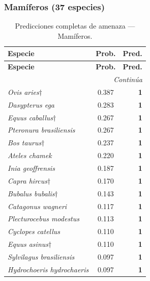 \documentclass[12pt,a4paper]{article}
\begin{document}
\bigskip

\subsubsection*{Mamíferos (37 especies)}

\begin{longtable}{p{6.2cm}cr}
  \caption{Predicciones completas de amenaza --- Mamíferos.} \label{tab:pred_mamiferos} \\
  \toprule
  \textbf{Especie} & \textbf{Prob.} & \textbf{Pred.} \\
  \midrule
  \endfirsthead
  \toprule
  \textbf{Especie} & \textbf{Prob.} & \textbf{Pred.} \\
  \midrule
  \endhead
  \midrule \multicolumn{3}{r}{\textit{Continúa}} \\
  \endfoot
  \bottomrule
  \endlastfoot
  \rowcolor{grisCelda}\textit{Ovis aries}$\dagger$ & 0.387 & \textbf{1} \\
  \rowcolor{grisCelda}\textit{Dasypterus ega} & 0.283 & \textbf{1} \\
  \rowcolor{grisCelda}\textit{Equus caballus}$\dagger$ & 0.267 & \textbf{1} \\
  \rowcolor{grisCelda}\textit{Pteronura brasiliensis} & 0.267 & \textbf{1} \\
  \rowcolor{grisCelda}\textit{Bos taurus}$\dagger$ & 0.237 & \textbf{1} \\
  \rowcolor{grisCelda}\textit{Ateles chamek} & 0.220 & \textbf{1} \\
  \rowcolor{grisCelda}\textit{Inia geoffrensis} & 0.187 & \textbf{1} \\
  \rowcolor{grisCelda}\textit{Capra hircus}$\dagger$ & 0.170 & \textbf{1} \\
  \rowcolor{grisCelda}\textit{Bubalus bubalis}$\dagger$ & 0.143 & \textbf{1} \\
  \rowcolor{grisCelda}\textit{Catagonus wagneri} & 0.117 & \textbf{1} \\
  \rowcolor{grisCelda}\textit{Plecturocebus modestus} & 0.113 & \textbf{1} \\
  \rowcolor{grisCelda}\textit{Cyclopes catellus} & 0.110 & \textbf{1} \\
  \rowcolor{grisCelda}\textit{Equus asinus}$\dagger$ & 0.110 & \textbf{1} \\
  \rowcolor{grisCelda}\textit{Sylvilagus brasiliensis} & 0.097 & \textbf{1} \\
  \rowcolor{grisCelda}\textit{Hydrochoeris hydrochaeris} & 0.097 & \textbf{1} \\

\end{longtable}
\end{document}
